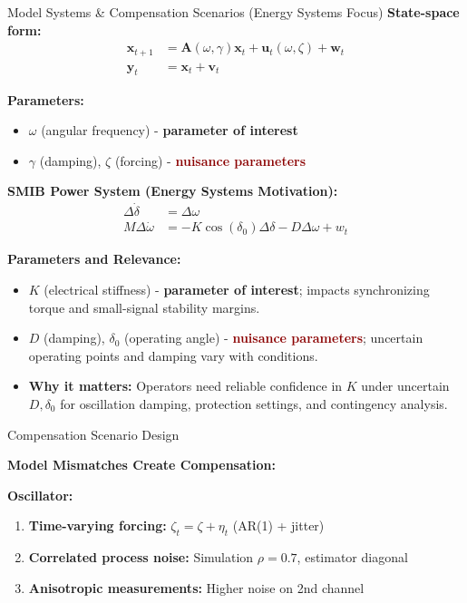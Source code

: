 \documentclass[final,hyperref={pdfpagelabels=false}]{beamer}
\begin{document}
\begin{frame}[t]
\begin{columns}[t,totalwidth=\textwidth]
\begin{column}{0.36\textwidth}
\begin{block}{Model Systems \& Compensation Scenarios (Energy Systems Focus)}
\textbf{State-space form:}
\begin{align}
\mathbf{x}_{t+1} &= \mathbf{A}(\omega, \gamma) \mathbf{x}_t + \mathbf{u}_t(\omega, \zeta) + \mathbf{w}_t \\
\mathbf{y}_t &= \mathbf{x}_t + \mathbf{v}_t
\end{align}

\textbf{Parameters:}
\begin{itemize}
\item $\omega$ (angular frequency) - \textcolor{UTblue}{\textbf{parameter of interest}}
\item $\gamma$ (damping), $\zeta$ (forcing) - \textcolor{darkred}{\textbf{nuisance parameters}}
\end{itemize}

\vspace{0.5cm}

\textbf{SMIB Power System (Energy Systems Motivation):}
\begin{align}
\Delta\dot{\delta} &= \Delta\omega \\
M\Delta\dot{\omega} &= -K\cos(\delta_0)\Delta\delta - D\Delta\omega + w_t
\end{align}

\textbf{Parameters and Relevance:}
\begin{itemize}
\item $K$ (electrical stiffness) - \textcolor{UTblue}{\textbf{parameter of interest}}; impacts synchronizing torque and small-signal stability margins.
\item $D$ (damping), $\delta_0$ (operating angle) - \textcolor{darkred}{\textbf{nuisance parameters}}; uncertain operating points and damping vary with conditions.
\item \textbf{Why it matters:} Operators need reliable confidence in $K$ under uncertain $D,\delta_0$ for oscillation damping, protection settings, and contingency analysis.
\end{itemize}

\end{block}

\begin{alertblock}{Compensation Scenario Design}
\small

\textbf{Model Mismatches Create Compensation:}

\textbf{Oscillator:}
\begin{enumerate}
\item \textbf{Time-varying forcing:} $\zeta_t = \zeta + \eta_t$ (AR(1) + jitter)
\item \textbf{Correlated process noise:} Simulation $\rho = 0.7$, estimator diagonal
\item \textbf{Anisotropic measurements:} Higher noise on 2nd channel
\end{enumerate}


\end{alertblock}
\end{column}
\end{columns}
\end{frame}
\end{document}
